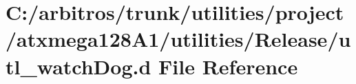 \hypertarget{utilities_2project_2atxmega128_a1_2utilities_2_release_2utl__watch_dog_8d}{\section{C\-:/arbitros/trunk/utilities/project/atxmega128\-A1/utilities/\-Release/utl\-\_\-watch\-Dog.d File Reference}
\label{utilities_2project_2atxmega128_a1_2utilities_2_release_2utl__watch_dog_8d}
}
